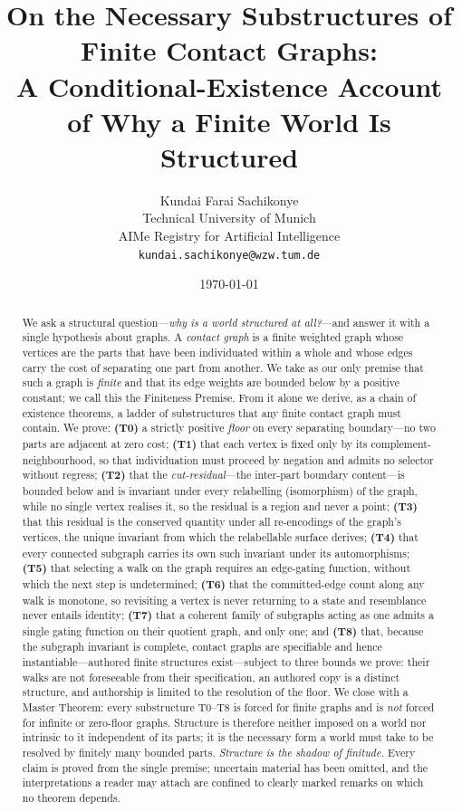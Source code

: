 \documentclass[11pt,a4paper]{article}
\title{\textbf{On the Necessary Substructures of Finite Contact Graphs:\\[2pt]
A Conditional-Existence Account of Why a Finite World Is Structured}}
\author{%
Kundai Farai Sachikonye\\
\small Technical University of Munich\\
\small AIMe Registry for Artificial Intelligence\\
\small \texttt{kundai.sachikonye@wzw.tum.de}}
\date{\today}
\theoremstyle{thmstyle}
\theoremstyle{definition}
\theoremstyle{remark}
\begin{document}
\maketitle

\begin{abstract}
\noindent
We ask a structural question---\emph{why is a world structured at all?}---and
answer it with a single hypothesis about graphs. A \emph{contact graph} is a
finite weighted graph whose vertices are the parts that have been individuated
within a whole and whose edges carry the cost of separating one part from
another. We take as our only premise that such a graph is \emph{finite} and
that its edge weights are bounded below by a positive constant; we call this the
Finiteness Premise. From it alone we derive, as a chain of existence theorems, a
ladder of substructures that any finite contact graph must contain. We prove:
\textbf{(T0)} a strictly positive \emph{floor} on every separating boundary---no
two parts are adjacent at zero cost; \textbf{(T1)} that each vertex is fixed only
by its complement-neighbourhood, so that individuation must proceed by negation
and admits no selector without regress; \textbf{(T2)} that the
\emph{cut-residual}---the inter-part boundary content---is bounded below and is
invariant under every relabelling (isomorphism) of the graph, while no single
vertex realises it, so the residual is a region and never a point; \textbf{(T3)}
that this residual is the conserved quantity under all re-encodings of the
graph's vertices, the unique invariant from which the relabellable surface
derives; \textbf{(T4)} that every connected subgraph carries its own such
invariant under its automorphisms; \textbf{(T5)} that selecting a walk on the
graph requires an edge-gating function, without which the next step is
undetermined; \textbf{(T6)} that the committed-edge count along any walk is
monotone, so revisiting a vertex is never returning to a state and resemblance
never entails identity; \textbf{(T7)} that a coherent family of subgraphs acting
as one admits a single gating function on their quotient graph, and only one;
and \textbf{(T8)} that, because the subgraph invariant is complete, contact
graphs are specifiable and hence instantiable---authored finite structures
exist---subject to three bounds we prove: their walks are not foreseeable from
their specification, an authored copy is a distinct structure, and authorship is
limited to the resolution of the floor. We close with a Master Theorem: every
substructure T0--T8 is forced for finite graphs and is \emph{not} forced for
infinite or zero-floor graphs. Structure is therefore neither imposed on a world
nor intrinsic to it independent of its parts; it is the necessary form a world
must take to be resolved by finitely many bounded parts. \emph{Structure is the
shadow of finitude.} Every claim is proved from the single premise; uncertain
material has been omitted, and the interpretations a reader may attach are
confined to clearly marked remarks on which no theorem depends.
\end{abstract}
\end{document}
